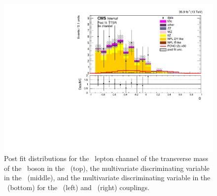 \begin{figure}[htbp]
	\includegraphics[width=0.49\linewidth]{6_Search/Figures/ZctFit/New/shapes_fit_s_LepChan_3e_TTSR_error_trial.pdf}
	\caption{Post fit distributions for the \eee\  lepton channel of the transverse mass of the \PW\ boson in the \WZCR\ (top), the multivariate discriminating variable in the \STSR\ (middle), and the multivariate discriminating variable in the \TTSR\ (bottom) for the \Zut\ (left) and \Zct\ (right) couplings. }
	\label{fig:shapesfit3e}
\end{figure}

